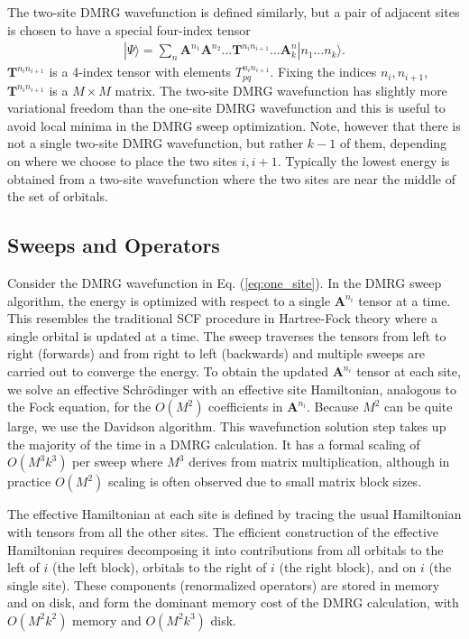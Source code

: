\documentclass[letterpaper,12pt,aps, pra]{revtex4-1}
\begin{document}
The two-site DMRG wavefunction is defined similarly,
but a pair of adjacent sites is chosen to have a special four-index tensor
\begin{align}
|\Psi\rangle = \sum_{n} \mathbf{A}^{n_1} \mathbf{A}^{n_2}\ldots \mathbf{T}^{n_i n_{i+1}} \ldots \mathbf{A}^{n}_k |n_1 \ldots n_k\rangle \label{eq:two_site}.
\end{align}
 $\mathbf{T}^{n_i n_{i+1}}$ is a 4-index tensor with elements $T^{n_i n_{i+1}}_{pq}$. Fixing the indices $n_i, n_{i+1}$, 
 $\mathbf{T}^{n_i n_{i+1}}$ is a $M \times M$ matrix.
The two-site DMRG wavefunction has slightly more variational freedom than the one-site DMRG wavefunction 
and this  is useful to avoid local minima in the DMRG sweep optimization. Note, however
that there is not a single two-site DMRG wavefunction, but rather $k-1$ of them, depending
on where we choose to place the two sites $i, i+1$. Typically
the lowest energy is obtained from a two-site wavefunction where the two sites are near the middle of the set of orbitals. 

\subsection{Sweeps and Operators} 

Consider the DMRG wavefunction in Eq. (\ref{eq:one_site}).
In the DMRG sweep algorithm,
the energy is optimized with respect to a single $\mathbf{A}^{n_i}$ tensor at a time. This resembles
 the traditional SCF procedure in  Hartree-Fock theory where a single orbital is updated at a time.
The sweep traverses the tensors from left to right (forwards) and from right to left (backwards)
and multiple sweeps are carried out to converge the energy. To obtain the updated $\mathbf{A}^{n_i}$ tensor at each
site, we solve an effective Schr\"odinger with an effective site Hamiltonian, analogous to the Fock equation, for the $O(M^2)$ coefficients in $\mathbf{A}^{n_i}$. 
Because
$M^2$ can be quite large, we use the Davidson algorithm.  This wavefunction solution step
takes up the majority of the time in a DMRG calculation. It  has a formal scaling of $O(M^3 k^3)$ per sweep where $M^3$ derives
from matrix multiplication, although in practice $O(M^2)$ scaling is often observed due to  small matrix block sizes.

The effective Hamiltonian at each site is defined by tracing the usual Hamiltonian with
 tensors from all the other  sites. The efficient construction of the effective Hamiltonian requires
decomposing it into contributions from all orbitals to the left of $i$ (the left block), orbitals to the right of $i$ (the right block),
and on $i$ (the single site). These components (renormalized operators) are stored in memory and on disk,
and form the dominant memory cost of the DMRG calculation, with $O(M^2 k^2)$ memory and $O(M^2 k^3)$ disk. 
\end{document}
